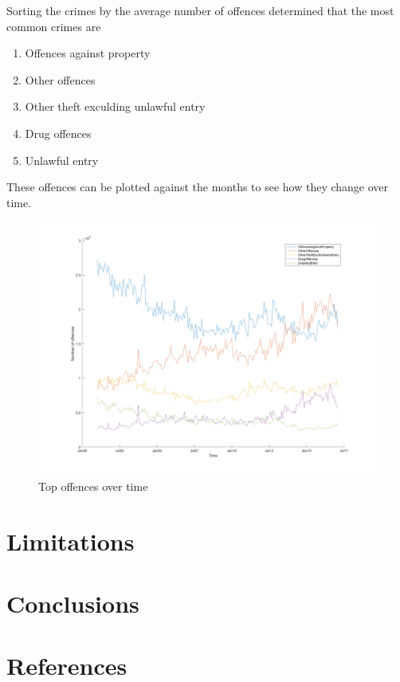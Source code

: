 \documentclass[]{article}
\begin{document}
Sorting the crimes by the average number of offences determined that the most common crimes are

\begin{enumerate}
    \item Offences against property
    \item Other offences
    \item Other theft exculding unlawful entry
    \item Drug offences
    \item Unlawful entry
\end{enumerate}

These offences can be plotted against the months to see how they change over time.

\begin{figure}[H]
    \caption{Top offences over time}
    \centering
    \includegraphics[width=\linewidth]{../images/top_offences_over_time}
\end{figure}

\section{Limitations}

\section{Conclusions}

\section{References}



\end{document}

